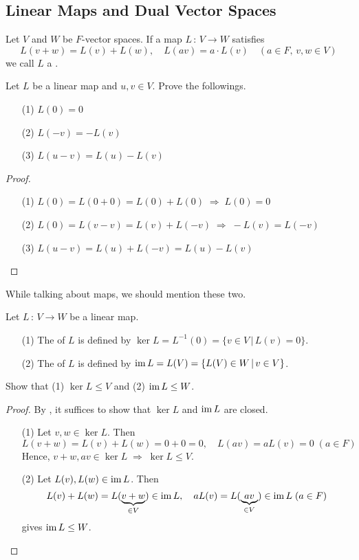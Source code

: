 \documentclass[a4paper, 10pt]{article}
\begin{document}
\subsection{Linear Maps and Dual Vector Spaces}
\begin{definition}
    Let $V$ and $W$ be $F$-vector spaces. If a map $L \,:\, V \rightarrow W$ satisfies
    \[ L(v+w) = L(v) + L(w), \quad L(av) = a\cdot L(v) \quad (a \in F, \, v, w \in V) \]
    we call $L$ a .
\end{definition}
\begin{exer}
    Let $L$ be a linear map and $u, v \in V$. Prove the followings.
    \begin{itemize}
        \item[(1)] $L(0) = 0$
        \item[(2)] $L(-v) = -L(v)$
        \item[(3)] $L(u-v) = L(u) - L(v)$
    \end{itemize}
\end{exer}
\begin{proof}
    \begin{itemize}
        \item[(1)] $L(0) = L(0+0) = L(0) + L(0) \;\Longrightarrow\; L(0) = 0$
        \item[(2)] $L(0) = L(v-v) = L(v) + L(-v) \;\Longrightarrow\; -L(v) = L(-v)$
        \item[(3)] $L(u-v) = L(u) + L(-v) = L(u) - L(v)$
    \end{itemize}
\end{proof}
While talking about maps, we should mention these two.
\begin{definition}
    Let $L \,:\, V \rightarrow W$ be a linear map.
    \begin{itemize}
        \item[(1)] The  of $L$ is defined by $\ker L = L^{-1}(0) = \{ v \in V \,|\, L(v) = 0 \}$.
        \item[(2)] The  of $L$ is defined by $\mathrm{im}\, L = L(V) = \{ L(V) \in W \,|\, v \in V \}$.
    \end{itemize}
\end{definition}
\begin{exer}
    Show that (1) $\ker L \leq V$ and (2) $\mathrm{im}\, L \leq W$.
\end{exer}
\begin{proof}
    By , it suffices to show that $\ker L$ and $\mathrm{im}\, L$ are closed.
    \begin{itemize}
        \item[(1)] Let $v, w \in \ker L$. Then
        \[ L(v + w) = L(v) + L(w) = 0 + 0 = 0, \quad L(av) = aL(v) = 0 \; (a \in F) \]
        Hence, $v + w, av \in \ker L \;\Longrightarrow\; \ker L \leq V$.
        \item[(2)] Let $L(v), L(w) \in \mathrm{im}\, L$. Then
        \[ L(v) + L(w) = L(\underbrace{v+w}_{\in V}) \in \mathrm{im}\, L, \quad aL(v) = L(\underbrace{av}_{\in V}) \in \mathrm{im}\, L \; (a \in F) \]
        gives $\mathrm{im}\, L \leq W$.
    \end{itemize}
\end{proof}
\newpage
\end{document}
